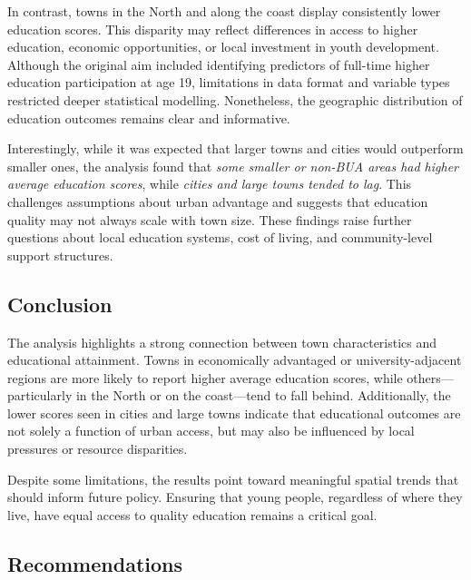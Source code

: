 \documentclass[
  letterpaper,
  DIV=11,
  numbers=noendperiod]{scrartcl}
\begin{document}
In contrast, towns in the North and along the coast display consistently
lower education scores. This disparity may reflect differences in access
to higher education, economic opportunities, or local investment in
youth development. Although the original aim included identifying
predictors of full-time higher education participation at age 19,
limitations in data format and variable types restricted deeper
statistical modelling. Nonetheless, the geographic distribution of
education outcomes remains clear and informative.

Interestingly, while it was expected that larger towns and cities would
outperform smaller ones, the analysis found that \emph{some smaller or
non-BUA areas had higher average education scores}, while \emph{cities
and large towns tended to lag}. This challenges assumptions about urban
advantage and suggests that education quality may not always scale with
town size. These findings raise further questions about local education
systems, cost of living, and community-level support structures.

\subsection{Conclusion}\label{conclusion}

The analysis highlights a strong connection between town characteristics
and educational attainment. Towns in economically advantaged or
university-adjacent regions are more likely to report higher average
education scores, while others---particularly in the North or on the
coast---tend to fall behind. Additionally, the lower scores seen in
cities and large towns indicate that educational outcomes are not solely
a function of urban access, but may also be influenced by local
pressures or resource disparities.

Despite some limitations, the results point toward meaningful spatial
trends that should inform future policy. Ensuring that young people,
regardless of where they live, have equal access to quality education
remains a critical goal.

\subsection{Recommendations}\label{recommendations}
\end{document}
